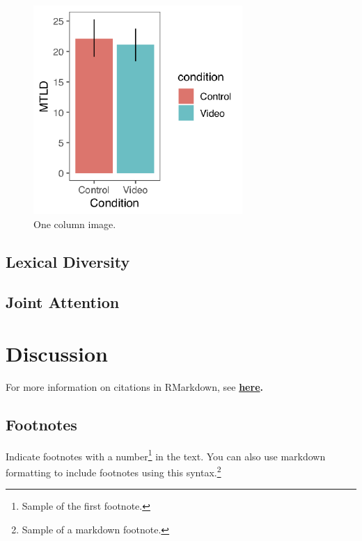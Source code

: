 \documentclass[10pt, letterpaper]{article}
\newenvironment{CodeChunk}{}{}
\begin{document}
\begin{CodeChunk}
\begin{figure}[H]

{\centering \includegraphics{figs/e2MTLD-1} 

}

\caption[One column image]{One column image.}\label{fig:e2MTLD}
\end{figure}
\end{CodeChunk}

\subsection{Lexical Diversity}\label{lexical-diversity-1}

\subsection{Joint Attention}\label{joint-attention-1}

\section{Discussion}\label{discussion}

For more information on citations in RMarkdown, see
\textbf{\href{http://rmarkdown.rstudio.com/authoring_bibliographies_and_citations.html\#citations}{here}.}

\subsection{Footnotes}\label{footnotes}

Indicate footnotes with a number\footnote{Sample of the first
footnote.} in the text. You can also use markdown formatting to include
footnotes using this syntax.\footnote{Sample of a markdown footnote.}
\end{document}
